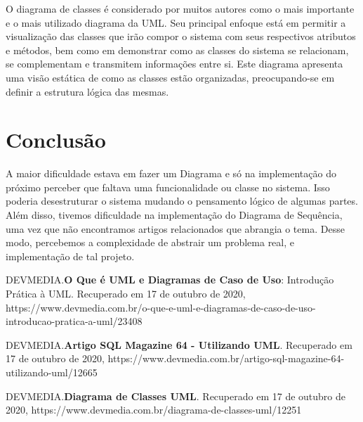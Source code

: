 \documentclass[12pt]{report}
\begin{document}
{{
}
}


\newpage
O diagrama de classes é considerado por muitos autores como o mais importante e
  o mais utilizado diagrama da UML. Seu principal enfoque está em permitir a visualização
  das classes que irão compor o sistema com seus respectivos atributos e métodos,
  bem como em demonstrar como as classes do sistema se relacionam, se complementam e
  transmitem informações entre si. Este diagrama apresenta uma visão estática de como
  as classes estão organizadas, preocupando-se em definir a estrutura lógica das mesmas.

  \section{Conclusão}
  A maior dificuldade estava em fazer um Diagrama e só na implementação do próximo
  perceber que faltava uma funcionalidade ou classe no sistema. Isso poderia desestruturar
  o sistema mudando o pensamento lógico de algumas partes.\\
  Além disso, tivemos dificuldade na implementação do  Diagrama de Sequência,
  uma vez que não encontramos artigos relacionados que abrangia o tema.
  Desse modo, percebemos a complexidade de abstrair um problema real,
  e implementação de tal projeto.

  \newpage
  \begin{thebibliography}{4}
    DEVMEDIA.\textbf{O Que é UML e Diagramas de Caso de Uso}: Introdução Prática à UML. 
    Recuperado em 17 de outubro de 2020,
    https://www.devmedia.com.br/o-que-e-uml-e-diagramas-de-caso-de-uso-introducao-pratica-a-uml/23408

    DEVMEDIA.\textbf{Artigo SQL Magazine 64 - Utilizando UML}. 
    Recuperado em 17 de outubro de 2020,
    https://www.devmedia.com.br/artigo-sql-magazine-64-utilizando-uml/12665
  
    DEVMEDIA.\textbf{Diagrama de Classes UML}. 
    Recuperado em 17 de outubro de 2020,
    https://www.devmedia.com.br/diagrama-de-classes-uml/12251
    \end{thebibliography}
\end{document}
